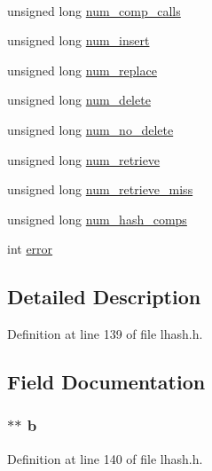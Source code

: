\begin{DoxyCompactItemize}
$$\item 
unsigned long \hyperlink{structlhash__st_a1d007833a30562acedb2994369c22deb}{num\+\_\+comp\+\_\+calls}
\item 
unsigned long \hyperlink{structlhash__st_a89aa2ffaf106815d464e83179467d4bc}{num\+\_\+insert}
\item 
unsigned long \hyperlink{structlhash__st_a2757120aebd9f9bbeda735299cb29b0c}{num\+\_\+replace}
\item 
unsigned long \hyperlink{structlhash__st_ae4bf11cd35dfa4c2c09c096d682d7ca2}{num\+\_\+delete}
\item 
unsigned long \hyperlink{structlhash__st_af664b1b0e185aed79d66dc35cb134634}{num\+\_\+no\+\_\+delete}
\item 
unsigned long \hyperlink{structlhash__st_adcc130ea97d4686b901c4fa01f7eac1a}{num\+\_\+retrieve}
\item 
unsigned long \hyperlink{structlhash__st_ac7d1ab0bf91b270a1fa430f056e85633}{num\+\_\+retrieve\+\_\+miss}
\item 
unsigned long \hyperlink{structlhash__st_ae3be3adefb12e998ff113a1fadd19340}{num\+\_\+hash\+\_\+comps}
\item 
int \hyperlink{structlhash__st_a11614f44ef4d939bdd984953346a7572}{error}
\end{DoxyCompactItemize}


\subsection{Detailed Description}


Definition at line 139 of file lhash.\+h.



\subsection{Field Documentation}
\subsubsection[{\texorpdfstring{b}{b}}]{ $\ast$$\ast$ b}\hypertarget{structlhash__st_ad344de66a1feec7e15243d1ddfd46e1d}{}\label{structlhash__st_ad344de66a1feec7e15243d1ddfd46e1d}


Definition at line 140 of file lhash.\+h.

